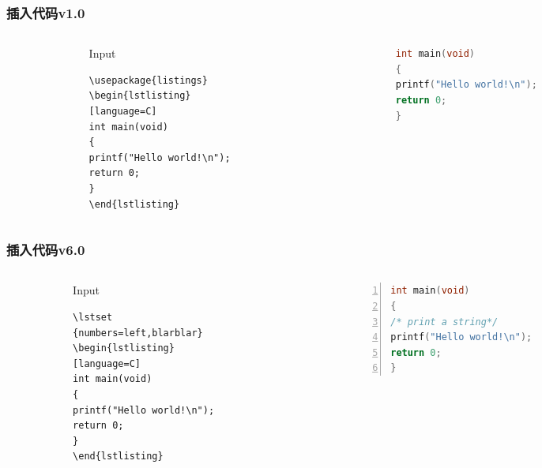 \begin{frame}[fragile]\frametitle{插入代码v1.0}
  \begin{columns}
    \begin{column}{0.05\textwidth}
    \end{column}
    \begin{column}{0.45\textwidth}
    \begin{block}{Input}
    \begin{verbatim}
\usepackage{listings}
\begin{lstlisting}
[language=C]
int main(void)
{
printf("Hello world!\n");
return 0;
}
\end{lstlisting}
    \end{verbatim}
    \end{block}
    \end{column}
    \begin{column}{0.025\textwidth}
    \end{column}
    \begin{column}{0.45\textwidth}
\begin{lstlisting}[language=C]
int main(void)
{
printf("Hello world!\n");
return 0;
}
\end{lstlisting}
    \end{column}
    \begin{column}{0.025\textwidth}
    \end{column}
  \end{columns}
\end{frame}

\begin{frame}[fragile]\frametitle{插入代码v6.0}
  \begin{columns}
    \begin{column}{0.005\textwidth}
    \end{column}
    \begin{column}{0.425\textwidth}
    \begin{block}{Input}
    \begin{verbatim}
\lstset
{numbers=left,blarblar}
\begin{lstlisting}
[language=C]
int main(void)
{
printf("Hello world!\n");
return 0;
}
\end{lstlisting}
    \end{verbatim}
    \end{block}
    \end{column}
    \begin{column}{0.025\textwidth}
    \end{column}
    \begin{column}{0.52\textwidth}
\begin{lstlisting}[language=C, numbers=left,
numberstyle=\tiny, keywordstyle=\color{blue!70}, commentstyle=\color{red!50!green!50!blue!50},
frame=shadowbox, rulesepcolor=\color{red!20!green!20!blue!20}]
int main(void)
{
/* print a string*/
printf("Hello world!\n");
return 0;
}
\end{lstlisting}
    \end{column}
    \begin{column}{0.025\textwidth}
    \end{column}
  \end{columns}
\end{frame}

